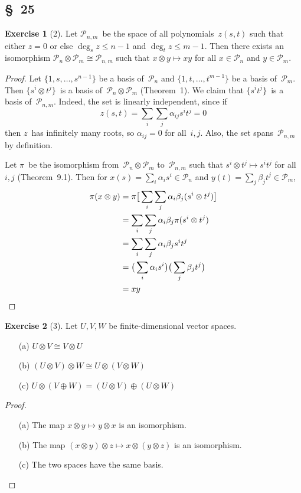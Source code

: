 \documentclass[letterpaper,12pt]{article}
\renewcommand{\P}{\mathcal{P}}
\newcommand{\iso}{\cong}
\newcommand{\dsum}{\oplus}
\newcommand{\tprod}{\otimes}
\theoremstyle{definition}
\newtheorem*{exer}{Exercise}
\theoremstyle{remark}
\theoremstyle{direction}
\begin{document}
\subsection*{\S~25}
\begin{exer}[2]
Let \(\P_{n,m}\)~be the space of all polynomials~\(z(s,t)\) such that either \(z=0\) or else \(\deg_s z\le n-1\) and \(\deg_t z\le m-1\). Then there exists an isomorphism \(\P_n\tprod\P_m\iso\P_{n,m}\) such that \(x\tprod y\mapsto xy\) for all \(x\in\P_n\) and \(y\in\P_m\).
\end{exer}
\begin{proof}
Let \(\{1,s,\ldots,s^{n-1}\}\) be a basis of~\(\P_n\) and \(\{1,t,\ldots,t^{m-1}\}\) be a basis of~\(\P_m\). Then \(\{s^i\tprod t^j\}\)~is a basis of~\(\P_n\tprod\P_m\) (Theorem~1). We claim that \(\{s^it^j\}\)~is a basis of~\(\P_{n,m}\). Indeed, the set is linearly independent, since if
\[z(s,t)=\sum_i\sum_j\alpha_{ij}s^it^j=0\]
then \(z\)~has infinitely many roots, so \(\alpha_{ij}=0\) for all~\(i,j\). Also, the set spans~\(\P_{n,m}\) by definition.

Let \(\pi\)~be the isomorphism from~\(\P_n\tprod\P_m\) to~\(\P_{n,m}\) such that \(s^i\tprod t^j\mapsto s^it^j\) for all~\(i,j\) (Theorem~9.1). Then for \(x(s)=\sum_i\alpha_is^i\in\P_n\) and \(y(t)=\sum_j\beta_jt^j\in\P_m\),
\begin{align*}
\pi(x\tprod y)&=\pi\bigl[\,\sum_i\sum_j\alpha_i\beta_j(s^i\tprod t^j)\bigr]\\
	&=\sum_i\sum_j\alpha_i\beta_j\pi(s^i\tprod t^j)\\
	&=\sum_i\sum_j\alpha_i\beta_js^i t^j\\
	&=\bigl(\,\sum_i\alpha_is^i\bigr)\bigl(\,\sum_j\beta_jt^j\bigr)\\
	&=xy\qedhere
\end{align*}
\end{proof}

\begin{exer}[3]
Let \(U,V,W\) be finite-dimensional vector spaces.
\begin{enumerate}
\item[(a)] \(U\tprod V\iso V\tprod U\)
\item[(b)] \((U\tprod V)\tprod W\iso U\tprod(V\tprod W)\)
\item[(c)] \(U\tprod(V\dsum W)=(U\tprod V)\dsum(U\tprod W)\)
\end{enumerate}
\end{exer}
\begin{proof}\
\begin{enumerate}
\item[(a)] The map \(x\tprod y\mapsto y\tprod x\) is an isomorphism.
\item[(b)] The map \((x\tprod y)\tprod z\mapsto x\tprod(y\tprod z)\) is an isomorphism.
\item[(c)] The two spaces have the same basis.\qedhere
\end{enumerate}
\end{proof}
\end{document}
